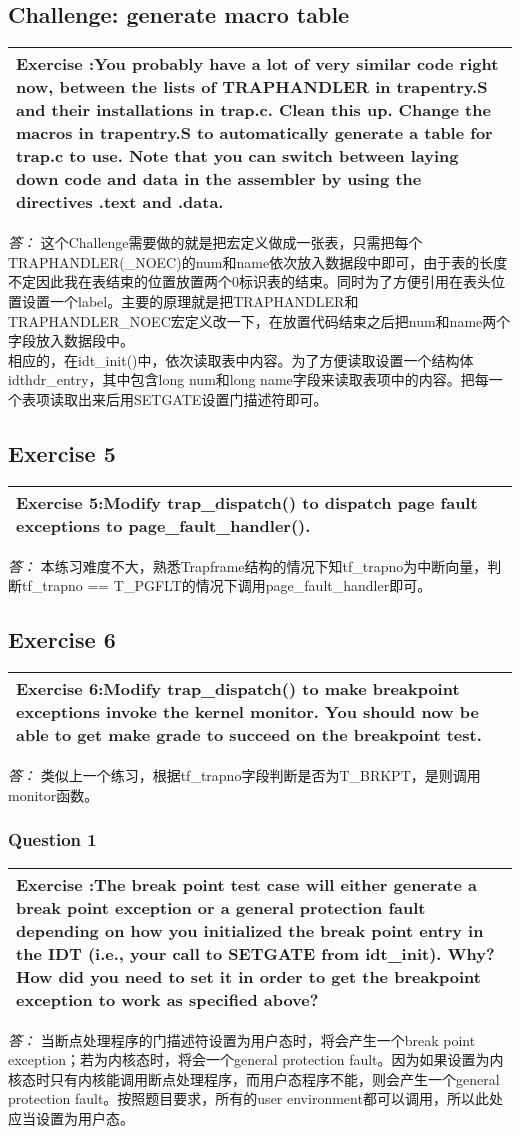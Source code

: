 \documentclass[11pt,a4paper]{article}
\newcommand{\exercise}[2]{
\begin{tabular}{|p{\textwidth}|}
\hline
Exercise #1:#2\\
\hline
\end{tabular}
\textit{\large{答：}}}
\begin{document}
\subsection{Challenge: generate macro table}
\exercise{}{You probably have a lot of very similar code right now, between the lists of TRAPHANDLER in trapentry.S and their installations in trap.c. Clean this up. Change the macros in trapentry.S to automatically generate a table for trap.c to use. Note that you can switch between laying down code and data in the assembler by using the directives .text and .data. }
这个Challenge需要做的就是把宏定义做成一张表，只需把每个TRAPHANDLER(\_NOEC)的num和name依次放入数据段中即可，由于表的长度不定因此我在表结束的位置放置两个0标识表的结束。同时为了方便引用在表头位置设置一个label。主要的原理就是把TRAPHANDLER和TRAPHANDLER\_NOEC宏定义改一下，在放置代码结束之后把num和name两个字段放入数据段中。\\
相应的，在idt\_init()中，依次读取表中内容。为了方便读取设置一个结构体idthdr\_entry，其中包含long num和long name字段来读取表项中的内容。把每一个表项读取出来后用SETGATE设置门描述符即可。\\

\subsection{Exercise 5}
\exercise{5}{Modify trap\_dispatch()  to dispatch page fault exceptions to page\_fault\_handler().}
本练习难度不大，熟悉Trapframe结构的情况下知tf\_trapno为中断向量，判断tf\_trapno == T\_PGFLT的情况下调用page\_fault\_handler即可。

\subsection{Exercise 6}
\exercise{6}{Modify trap\_dispatch() to make breakpoint exceptions invoke the kernel monitor. You should now be able to get make grade  to succeed on the breakpoint test. }
类似上一个练习，根据tf\_trapno字段判断是否为T\_BRKPT，是则调用monitor函数。

\subsubsection{Question 1}
\exercise{}{The break point test case will either generate a break point exception or a general protection fault depending on how you initialized the break point entry in the IDT (i.e., your call to SETGATE from idt\_init). Why? How did you need to set it in order to get the breakpoint exception to work as specified above? }
当断点处理程序的门描述符设置为用户态时，将会产生一个break point exception；若为内核态时，将会一个general protection fault。因为如果设置为内核态时只有内核能调用断点处理程序，而用户态程序不能，则会产生一个general protection fault。按照题目要求，所有的user environment都可以调用，所以此处应当设置为用户态。\\
\end{document}
